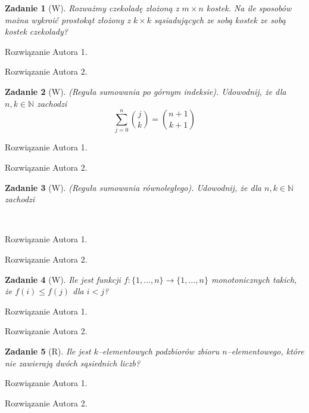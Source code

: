 \documentclass{mwart}
\newtheorem{zad}{Zadanie}[section]
\begin{document}
\begin{zad}[W]
    Rozważmy czekoladę złożoną z $m\times n$ kostek.
    Na ile sposobów można wykroić prostokąt złożony z $k \times k$
    sąsiadujących ze sobą kostek ze sobą kostek czekolady?
\end{zad}
\begin{mdframed}
    Rozwiązanie Autora 1.
\end{mdframed}
\begin{mdframed}
    Rozwiązanie Autora 2.
\end{mdframed}




\begin{zad}[W]
    (Reguła sumowania po górnym indeksie). Udowodnij, że dla
    $n, k \in \mathbb{N}$ zachodzi
    \[\sum_{j=0}^n\binom{j}{k} = \binom{n+1}{k+1}\]
\end{zad}
\begin{mdframed}
    Rozwiązanie Autora 1.
\end{mdframed}
\begin{mdframed}
    Rozwiązanie Autora 2.
\end{mdframed}




\begin{zad}[W]
    (Reguła sumowania równoległego). Udowodnij, że dla $n, k \in \mathbb{N}$
    zachodzi \[     \]
\end{zad}\
\begin{mdframed}
    Rozwiązanie Autora 1.
\end{mdframed}
\begin{mdframed}
    Rozwiązanie Autora 2.
\end{mdframed}



\begin{zad}[W]
    Ile jest funkcji $f:\{1, ..., n\} \to \{1, ..., n\}$ monotonicznych takich,
    że $f(i) \leq f(j) $ dla $i < j$?
\end{zad}
\begin{mdframed}
    Rozwiązanie Autora 1.
\end{mdframed}
\begin{mdframed}
    Rozwiązanie Autora 2.
\end{mdframed}




\begin{zad}[R]
    Ile jest $k$--elementowych podzbiorów zbioru $n$--elementowego, które nie
    zawierają dwóch sąsiednich liczb?
\end{zad}
\begin{mdframed}
    Rozwiązanie Autora 1.
\end{mdframed}
\begin{mdframed}
    Rozwiązanie Autora 2.
\end{mdframed}
\end{document}
